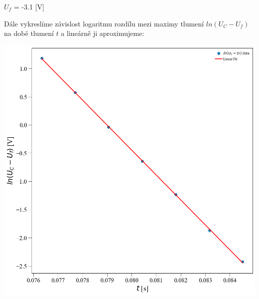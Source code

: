 \documentclass[a4paper,11pt]{article}
\begin{document}
\begin{minipage}[t]{0.5\textwidth}
\begin{center}
                    $U_f$ = -3.1 [V]
                \end{center}
                Dále vykreslíme závislost logaritmu rozdílu mezi maximy tlumení $ln(U_C-U_f)$ na době tlumení $t$ a lineárně ji aproximujeme: 
                \par \centering
                \vspace{10pt}
                \includegraphics[scale=0.3]{pod_krit_fit}
                \captionsetup{justification=centering, font=footnotesize}
                \label{fig:pod_krit_fit}
                \raggedright
                \vspace{10pt}
\end{minipage}
\newpage
\end{document}
